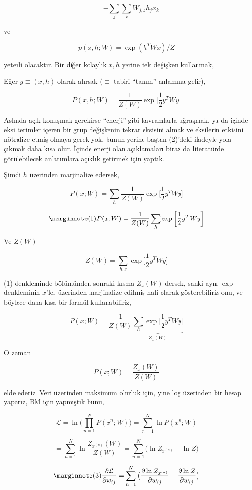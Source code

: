 \documentclass[12pt,fleqn]{article}\usepackage{../../common}
\begin{document}
$$ = - \sum_j \sum_k W_{j,k}h_jx_k  $$

ve

$$ p(x,h;W)  = \exp (h^TWx) / Z $$

yeterli olacaktır. Bir diğer kolaylık $x,h$ yerine tek değişken kullanmak,

Eğer $y \equiv (x,h)$ olarak alırsak ($\equiv$ tabiri ``tanım'' anlamına gelir), 


$$ P(x,h;W) = \frac{1}{Z(W)} \exp 
\bigg[ 
\frac{1}{2} y^T W y
\bigg]
$$

Aslında açık konuşmak gerekirse ``enerji'' gibi kavramlarla uğraşmak, ya da
içinde eksi terimler içeren bir grup değişkenin tekrar eksisini almak ve
eksilerin etkisini nötralize etmiş olmaya gerek yok, bunun yerine baştan
(2)'deki ifadeyle yola çıkmak daha kısa olur. İçinde enerji olan
açıklamaları biraz da literatürde görülebilecek anlatımlara açıklık
getirmek için yaptık.

Şimdi $h$ üzerinden marjinalize edersek,

$$ P(x;W) = \sum_h \frac{1}{Z(W)} \exp 
\bigg[ 
\frac{1}{2} y^T W y
\bigg]
$$


$$  
\mlabel{1}
P(x;W) = \frac{1}{Z(W)}  \sum_h \exp 
\bigg[ 
\frac{1}{2} y^T W y
\bigg]
$$


Ve $Z(W)$ 

$$ Z(W) = \sum_{h,x} \exp 
\bigg[ 
\frac{1}{2} y^T W y
\bigg]
$$

(1) denkleminde bölümünden sonraki kısma $Z_x(W)$ dersek, sanki aynı $\exp$
denkleminin $x$'ler üzerinden marjinalize edilmiş hali olarak
gösterebiliriz onu, ve böylece daha kısa bir formül kullanabiliriz,

$$  
P(x;W) = \frac{1}{Z(W)}  
\underbrace{
\sum_h \exp 
\bigg[ 
\frac{1}{2} y^T W y
\bigg]
}_{Z_x(W)}
$$

O zaman 

$$  
P(x;W) = \frac{Z_x(W)}{Z(W)} 
$$

elde ederiz. Veri üzerinden maksimum olurluk için, yine log üzerinden bir
hesap yaparız, BM için yapmıştık bunu,

$$  
\mathcal{L} = 
\ln \big( \prod_{n=1}^{N} P(x^{n};W) \big) = 
\sum_{n=1}^{N} \ln P(x^{n};W) 
$$

$$ 
= \sum_{n=1}^{N} \ln \frac{Z_{x^{(n)}}(W)}{Z(W)}  
= \sum_{n=1}^{N}  \big(\ln Z_{x^{(n)}} - \ln Z \big) 
$$

$$ 
\mlabel{3}
\frac{\partial \mathcal{L} }{\partial w_{ij}} = 
\sum_{n=1}^{N}  \big( \frac{\partial \ln Z_{x^{(n)}} }{\partial w_{ij}}
- \frac{\partial \ln Z }{\partial w_{ij}} \big)
$$
\end{document}
